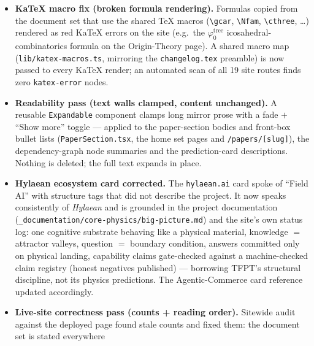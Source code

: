 \documentclass[11pt]{article}
\providecommand{\mO}{\textbf{[O]}}\providecommand{\mX}{\textbf{[X]}}
\begin{document}
\begin{itemize}[leftmargin=1.5em]
certification step (Kronheimer \texttt{v479}, four-interval \texttt{v480}, crossed-product
\texttt{v469}) with sub-text wrapping fixed; figures regenerated (PDF + website PNG). The
stale figure captions updated: \texttt{introduction} (timeline caption now spans the full
arc), \texttt{tfpt\_research\_contracts} (residual-chain caption now states the
\texttt{SEAM.EQUIV.01} bedrock and certification round; QFT-skeleton caption now names the
one \mO\ residual instead of the outdated ``two open items''). No numbers, statuses or
claims change anywhere.
\item \textbf{KaTeX macro fix (broken formula rendering).} Formulas copied from the document
set that use the shared TeX macros (\texttt{\textbackslash gcar},
\texttt{\textbackslash Nfam}, \texttt{\textbackslash cthree}, \dots) rendered as red KaTeX
errors on the site (e.g.\ the $\varphi_0^{\mathrm{tree}}$ icosahedral-combinatorics formula
on the Origin-Theory page). A shared macro map (\texttt{lib/katex-macros.ts}, mirroring the
\texttt{changelog.tex} preamble) is now passed to every KaTeX render; an automated scan of
all 19 site routes finds zero \texttt{katex-error} nodes.
\item \textbf{Readability pass (text walls clamped, content unchanged).} A reusable
\texttt{Expandable} component clamps long mirror prose with a fade $+$ ``Show more'' toggle
--- applied to the paper-section bodies and front-box bullet lists
(\texttt{PaperSection.tsx}, the home set pages and \texttt{/papers/[slug]}), the
dependency-graph node summaries and the prediction-card descriptions. Nothing is deleted;
the full text expands in place.
\item \textbf{Hylaean ecosystem card corrected.} The \texttt{hylaean.ai} card spoke of
``Field AI'' with structure tags that did not describe the project. It now speaks
consistently of \emph{Hylaean} and is grounded in the project documentation
(\texttt{\_documentation/core-physics/big-picture.md}) and the site's own status log: one
cognitive substrate behaving like a physical material, knowledge $=$ attractor valleys,
question $=$ boundary condition, answers committed only on physical landing, capability
claims gate-checked against a machine-checked claim registry (honest negatives published) ---
borrowing TFPT's structural discipline, not its physics predictions. The Agentic-Commerce
card reference updated accordingly.
\item \textbf{Live-site correctness pass (counts + reading order).} Sitewide audit against
the deployed page found stale counts and fixed them: the document set is stated everywhere

\end{itemize}
\end{document}
